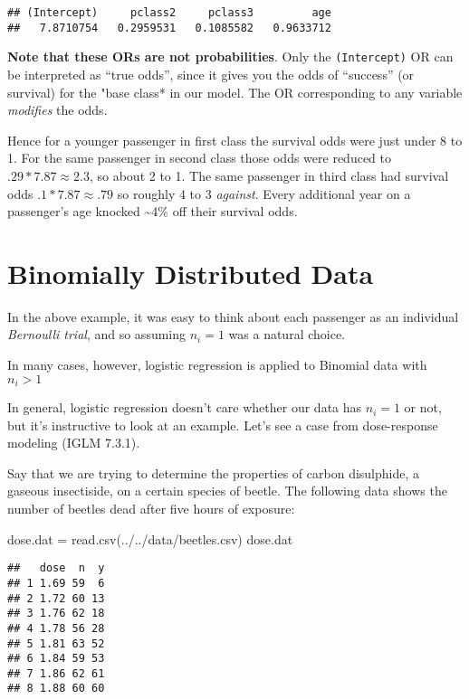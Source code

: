 \documentclass[
]{article}
\newenvironment{Shaded}{\begin{snugshade}}{\end{snugshade}}
\newcommand{\FunctionTok}[1]{\textcolor[rgb]{0.00,0.00,0.00}{#1}}
\newcommand{\NormalTok}[1]{#1}
\newcommand{\OtherTok}[1]{\textcolor[rgb]{0.56,0.35,0.01}{#1}}
\newcommand{\StringTok}[1]{\textcolor[rgb]{0.31,0.60,0.02}{#1}}
\begin{document}
\begin{verbatim}
## (Intercept)     pclass2     pclass3         age 
##   7.8710754   0.2959531   0.1085582   0.9633712
\end{verbatim}

\textbf{Note that these ORs are not probabilities}. Only the
\texttt{(Intercept)} OR can be interpreted as ``true odds'', since it
gives you the odds of ``success'' (or survival) for the "base class* in
our model. The OR corresponding to any variable \emph{modifies} the
odds.

Hence for a younger passenger in first class the survival odds were just
under 8 to 1. For the same passenger in second class those odds were
reduced to \(.29 * 7.87 \approx 2.3\), so about 2 to 1. The same
passenger in third class had survival odds \(.1*7.87 \approx .79\) so
roughly 4 to 3 \emph{against}. Every additional year on a passenger's
age knocked \textasciitilde4\% off their survival odds.

\hypertarget{binomially-distributed-data}{%
\section{Binomially Distributed
Data}\label{binomially-distributed-data}}

In the above example, it was easy to think about each passenger as an
individual \emph{Bernoulli trial}, and so assuming \(n_i=1\) was a
natural choice.

In many cases, however, logistic regression is applied to Binomial data
with \(n_i > 1\)

In general, logistic regression doesn't care whether our data has
\(n_i=1\) or not, but it's instructive to look at an example. Let's see
a case from dose-response modeling (IGLM 7.3.1).

Say that we are trying to determine the properties of carbon disulphide,
a gaseous insectiside, on a certain species of beetle. The following
data shows the number of beetles dead after five hours of exposure:

\begin{Shaded}
\begin{Highlighting}[]
\NormalTok{dose.dat }\OtherTok{=} \FunctionTok{read.csv}\NormalTok{(}\StringTok{\textquotesingle{}../../data/beetles.csv\textquotesingle{}}\NormalTok{)}
\NormalTok{dose.dat}
\end{Highlighting}
\end{Shaded}

\begin{verbatim}
##   dose  n  y
## 1 1.69 59  6
## 2 1.72 60 13
## 3 1.76 62 18
## 4 1.78 56 28
## 5 1.81 63 52
## 6 1.84 59 53
## 7 1.86 62 61
## 8 1.88 60 60
\end{verbatim}
\end{document}
